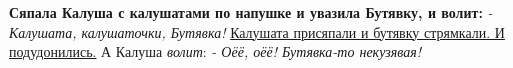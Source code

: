\documentclass{article}
\begin{document}
\textbf{Сяпала Калуша с калушатами по напушке и увазила Бутявку, и волит:}
\textit{- Калушата, калушаточки, Бутявка!}
\underline{Калушата присяпали и бутявку стрямкали. И подудонились.}
А Калуша \emph{волит}:
\textit{- Оёё, оёё! \emph{Бутявка}-то некузявая!}
\end{document}
